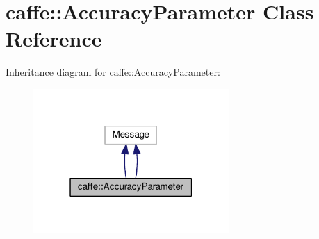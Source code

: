 \hypertarget{classcaffe_1_1_accuracy_parameter}{}\section{caffe\+:\+:Accuracy\+Parameter Class Reference}
\label{classcaffe_1_1_accuracy_parameter}


Inheritance diagram for caffe\+:\+:Accuracy\+Parameter\+:
\nopagebreak
\begin{figure}[H]
\begin{center}
\leavevmode
\includegraphics[width=211pt]{classcaffe_1_1_accuracy_parameter__inherit__graph}
\end{center}
\end{figure}
